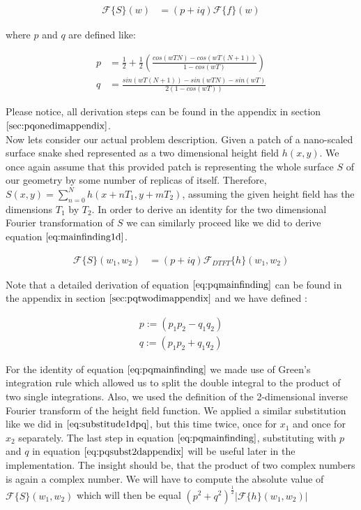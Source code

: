 \begin{align}
\mathcal{F}\{S\}(w)
& = (p+iq) \mathcal{F}\{f\}(w)  
\label{eq:mainfinding1d}
\end{align}

where $p$ and $q$ are defined like:

\begin{align}
p& =\frac{1}{2}+\frac{1}{2}\left(\frac{cos(wTN)-cos(wT(N+1))}{1-cos(wT)}\right) \nonumber \\
q& =\frac{sin(wT(N+1))-sin(wTN)-sin(wT)}{2(1-cos(wT))}
\end{align}

Please notice, all derivation steps can be found in the appendix in section $\ref{sec:pqonedimappendix}$. \\

Now lets consider our actual problem description. Given a patch of a nano-scaled surface snake shed represented as a two dimensional height field $h(x,y)$. We once again assume that this provided patch is representing the whole surface $S$ of our geometry by some number of replicas of itself. Therefore, $S(x,y) = \sum_{n=0}^{N} h(x+nT_1, y+mT_2)$, assuming the given height field has the dimensions $T_1$ by $T_2$. In order to derive an identity for the two dimensional Fourier transformation of $S$ we can similarly proceed like we did to derive equation $\ref{eq:mainfinding1d}$.

\begin{align}
\mathcal{F}\{S\}(w_1, w_2)
& =(p + iq) \mathcal{F}_{DTFT}\{h\}(w_1,w_2)
\label{eq:pqmainfinding}
\end{align}

Note that a detailed derivation of equation $\ref{eq:pqmainfinding}$ can be found in the appendix in section $\ref{sec:pqtwodimappendix}$ and we have defined :

\begin{align}
p := (p_1 p_2 - q_1 q_2) \nonumber \\ 
q := (p_1 p_2 + q_1 q_2)
\label{eq:pqsubst2}
\end{align}

For the identity of equation $\ref{eq:pqmainfinding}$ we made use of Green's integration rule which allowed us to split the double integral to the product of two single integrations. Also, we used the definition of the 2-dimensional inverse Fourier transform of the height field function. We applied a similar substitution like we did in $\ref{eq:substitude1dpq}$, but this time twice, once for $x_1$ and once for $x_2$ separately. The last step in equation $\ref{eq:pqmainfinding}$, substituting with $p$ and $q$ in equation $\ref{eq:pqsubst2dappendix}$ will be useful later in the implementation. The insight should be, that the product of two complex numbers is again a complex number. We will have to compute the absolute value of $\mathcal{F}\{S\}(w_1,w_2)$ which will then be equal $(p^2 + q^2)^{\frac{1}{2}}\left|\mathcal{F}\{h\}(w_1,w_2)\right|$

